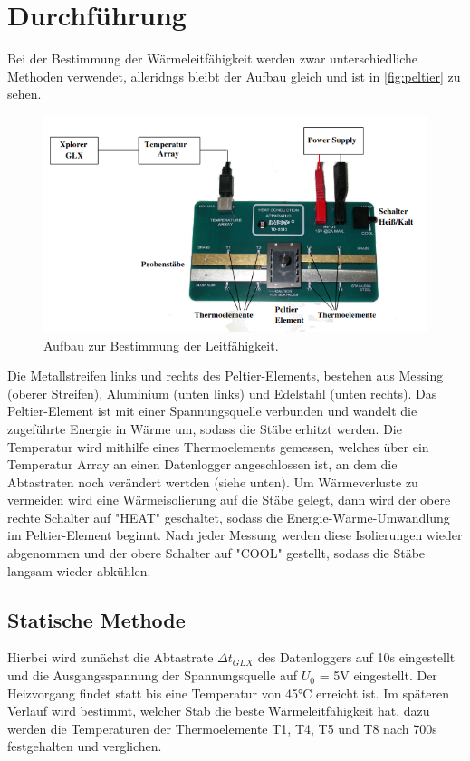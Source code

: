 \section{Durchführung}
\label{sec:Durchführung}

Bei der Bestimmung der Wärmeleitfähigkeit werden zwar unterschiedliche Methoden 
verwendet, alleridngs bleibt der Aufbau gleich und ist in \autoref{fig:peltier}
zu sehen.
\begin{figure}[h]
    \centering
        \centering
        \includegraphics[width=\textwidth]{Bilder/peltier.png}
        \caption{Aufbau zur Bestimmung der Leitfähigkeit. \cite{peltier}}
    \hfill
    \label{fig:peltier}
\end{figure}
Die Metallstreifen links und rechts des Peltier-Elements, bestehen aus Messing
(oberer Streifen), Aluminium (unten links) und Edelstahl (unten rechts). Das 
Peltier-Element ist mit einer Spannungsquelle verbunden und wandelt die 
zugeführte Energie in Wärme um, sodass die Stäbe erhitzt werden. Die Temperatur 
wird mithilfe eines Thermoelements gemessen, welches über ein Temperatur Array 
an einen Datenlogger angeschlossen ist, an dem die Abtastraten noch verändert
wertden (siehe unten). Um Wärmeverluste zu vermeiden wird eine Wärmeisolierung
auf die Stäbe gelegt, dann wird der obere rechte Schalter auf "HEAT" geschaltet, 
sodass die Energie-Wärme-Umwandlung im Peltier-Element beginnt.
Nach jeder Messung werden diese Isolierungen wieder abgenommen und der obere
Schalter auf "COOL" gestellt, sodass die Stäbe langsam wieder abkühlen.

\subsection{Statische Methode}
Hierbei wird zunächst die Abtastrate $\Delta t_{GLX}$ des Datenloggers auf 10s
eingestellt und die Ausgangsspannung der Spannungsquelle auf $U_0$ = 5V 
eingestellt. Der Heizvorgang findet statt bis eine Temperatur von 
45°C erreicht ist. Im späteren Verlauf wird bestimmt, welcher Stab die beste 
Wärmeleitfähigkeit hat, dazu werden die Temperaturen der Thermoelemente T1, T4, T5 und T8 
nach 700s festgehalten und verglichen.

